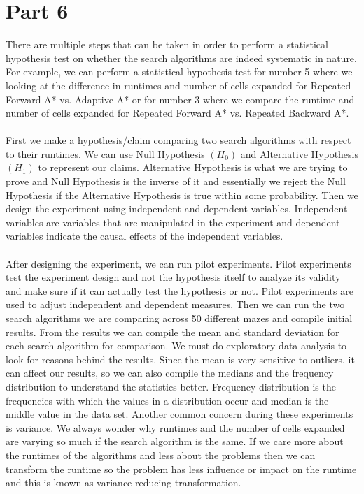 \documentclass[12pt, letterpaper]{article}
\begin{document}
\section*{Part 6}
There are multiple steps that can be taken in order to perform a statistical hypothesis test on whether the search algorithms are indeed systematic in nature. For example, we can perform a statistical hypothesis test for number 5 where we looking at the difference in runtimes and number of cells expanded for Repeated Forward A* vs. Adaptive A* or for number 3 where we compare the runtime and number of cells expanded for Repeated Forward A* vs. Repeated Backward A*.
\\~\\
First we make a hypothesis/claim comparing two search algorithms with respect to their runtimes. We can use Null Hypothesis $(H_0)$ and Alternative Hypothesis $(H_1)$ to represent our claims. Alternative Hypothesis is what we are trying to prove and Null Hypothesis is the inverse of it and essentially we reject the Null Hypothesis if the Alternative Hypothesis is true within some probability. Then we design the experiment using independent and dependent variables. Independent variables are variables that are manipulated in the experiment and dependent variables indicate the causal effects of the independent variables.
\\~\\
After designing the experiment, we can run pilot experiments. Pilot experiments test the experiment design and not the hypothesis itself to analyze its validity and make sure if it can actually test the hypothesis or not. Pilot experiments are used to adjust independent and dependent measures. Then we can run the two search algorithms we are comparing across 50 different mazes and compile initial results. From the results we can compile the mean and standard deviation for each search algorithm for comparison. We must do exploratory data analysis to look for reasons behind the results. Since the mean is very sensitive to outliers, it can affect our results, so we can also compile the medians and the frequency distribution to understand the statistics better. Frequency distribution is the frequencies with which the values in a distribution occur and median is the middle value in the data set. Another common concern during these experiments is variance. We always wonder why runtimes and the number of cells expanded are varying so much if the search algorithm is the same. If we care more about the runtimes of the algorithms and less about the problems then we can transform the runtime so the problem has less influence or impact on the runtime and this is known as variance-reducing transformation. 
\end{document}
